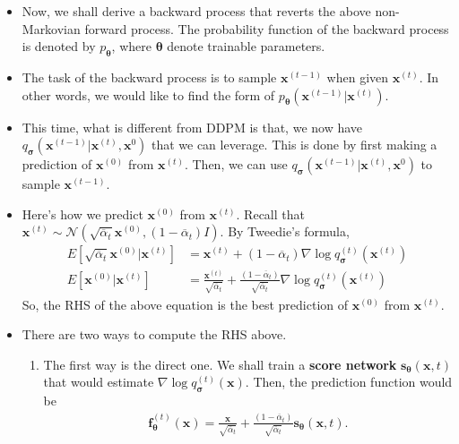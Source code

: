 \documentclass[10pt]{article}
\newcommand{\ve}[1]{\mathbf{#1}}
\newcommand{\ves}[1]{\boldsymbol{#1}}
\newcommand{\mcal}[1]{\mathcal{#1}}
\begin{document}
\begin{itemize}
  \item Now, we shall derive a backward process that reverts the above non-Markovian forward process. The probability function of the backward process is denoted by $p_{\ves{\theta}}$, where $\ves{\theta}$ denote trainable parameters.
  
  \item The task of the backward process is to sample $\ve{x}^{(t-1)}$ when given $\ve{x}^{(t)}$. In other words, we would like to find the form of $p_{\ves{\theta}}(\ve{x}^{(t-1)}|\ve{x}^{(t)})$.
  
  \item This time, what is different from DDPM is that, we now have $q_{\ves{\sigma}}(\ve{x}^{(t-1)}|\ve{x}^{(t)}, \ve{x}^{0})$ that we can leverage. This is done by first making a prediction of $\ve{x}^{(0)}$ from $\ve{x}^{(t)}$. Then, we can use $q_{\ves{\sigma}}(\ve{x}^{(t-1)}|\ve{x}^{(t)}, \ve{x}^{0})$ to sample $\ve{x}^{(t-1)}$.
  
  \item Here's how we predict $\ve{x}^{(0)}$ from $\ve{x}^{(t)}$. Recall that $\ve{x}^{(t)} \sim \mcal{N}( \sqrt{\overline{\alpha}_t} \ve{x}^{(0)}, (1 - \overline{\alpha}_t) I)$. By Tweedie's formula,
  \begin{align*}
    E[\sqrt{\overline{\alpha}_t} \ve{x}^{(0)}|\ve{x}^{(t)}] 
    &= \ve{x}^{(t)} + (1 - \overline{\alpha}_t) \nabla \log q_{\ves{\sigma}}^{(t)}(\ve{x}^{(t)}) \\
    E[\ve{x}^{(0)}|\ve{x}^{(t)}] 
    &= \frac{\ve{x}^{(t)}}{\sqrt{\overline{\alpha}_t}} + \frac{(1 - \overline{\alpha}_t)}{{\sqrt{\overline{\alpha}_t}} } \nabla \log q_{\ves{\sigma}}^{(t)}(\ve{x}^{(t)})
  \end{align*}
  So, the RHS of the above equation is the best prediction of $\ve{x}^{(0)}$ from $\ve{x}^{(t)}$. 

  \item There are two ways to compute the RHS above.
  \begin{enumerate}
    \item The first way is the direct one. We shall train a {\bf score network} $\ve{s}_{\ves{\theta}}(\ve{x}, t)$ that would estimate $\nabla \log q_{\ves{\sigma}}^{(t)}(\ve{x}).$ Then, the prediction function would be
    \begin{align*}
      \ve{f}^{(t)}_{\ves{\theta}}(\ve{x}) = \frac{\ve{x}}{\sqrt{\overline{\alpha}_t}} + \frac{(1 - \overline{\alpha}_t)}{{\sqrt{\overline{\alpha}_t}} } \ve{s}_{\ves{\theta}}(\ve{x}, t).
    \end{align*}


\end{enumerate}
\end{itemize}
\end{document}
